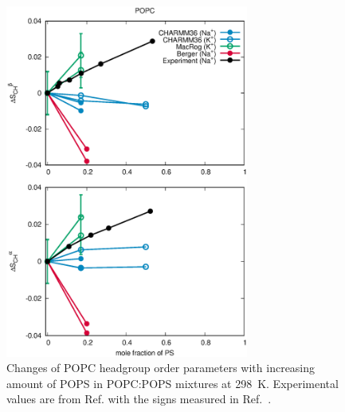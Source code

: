 \documentclass[aps,prl,superscriptaddress,twocolumn]{revtex4}
\begin{document}
\begin{figure}[!tb]
  \centering
  \includegraphics[width=8.0cm]{../Figs/HGorderparametersPCvsPS.eps}
  \caption{\label{HGorderparametersPCvsPS}
    Changes of POPC headgroup order parameters with increasing amount of POPS in POPC:POPS mixtures at 298~K.
    Experimental values are from Ref.  with the signs measured in Ref.~.
  }
\end{figure}
\end{document}
